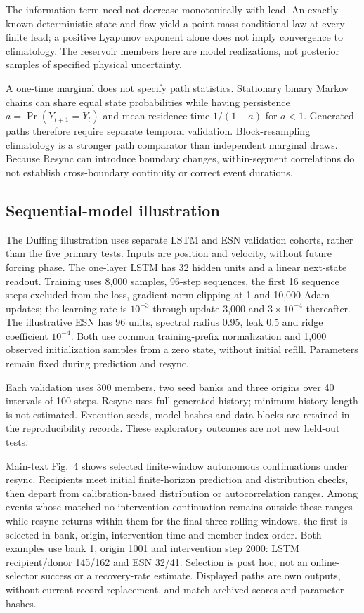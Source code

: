 \documentclass[gmd,manuscript]{copernicus}
\begin{document}
The information term need not decrease monotonically with lead. An exactly known deterministic state and flow yield a point-mass conditional law at every finite lead; a positive Lyapunov exponent alone does not imply convergence to climatology. The reservoir members here are model realizations, not posterior samples of specified physical uncertainty.

A one-time marginal does not specify path statistics. Stationary binary Markov chains can share equal state probabilities while having persistence $a=\Pr(Y_{t+1}=Y_t)$ and mean residence time $1/(1-a)$ for $a<1$. Generated paths therefore require separate temporal validation. Block-resampling climatology is a stronger path comparator than independent marginal draws. Because Resync can introduce boundary changes, within-segment correlations do not establish cross-boundary continuity or correct event durations.

\subsection{Sequential-model illustration}\label{app:note12}
The Duffing illustration uses separate LSTM and ESN validation cohorts, rather than the five primary tests. Inputs are position and velocity, without future forcing phase. The one-layer LSTM has 32 hidden units and a linear next-state readout. Training uses 8,000 samples, 96-step sequences, the first 16 sequence steps excluded from the loss, gradient-norm clipping at 1 and 10,000 Adam updates; the learning rate is $10^{-3}$ through update 3,000 and $3\times10^{-4}$ thereafter. The illustrative ESN has 96 units, spectral radius 0.95, leak 0.5 and ridge coefficient $10^{-4}$. Both use common training-prefix normalization and 1,000 observed initialization samples from a zero state, without initial refill. Parameters remain fixed during prediction and resync.

Each validation uses 300 members, two seed banks and three origins over 40 intervals of 100 steps. Resync uses full generated history; minimum history length is not estimated. Execution seeds, model hashes and data blocks are retained in the reproducibility records. These exploratory outcomes are not new held-out tests.

Main-text Fig.~4 shows selected finite-window autonomous continuations under resync. Recipients meet initial finite-horizon prediction and distribution checks, then depart from calibration-based distribution or autocorrelation ranges. Among events whose matched no-intervention continuation remains outside these ranges while resync returns within them for the final three rolling windows, the first is selected in bank, origin, intervention-time and member-index order. Both examples use bank 1, origin 1001 and intervention step 2000: LSTM recipient/donor 145/162 and ESN 32/41. Selection is post hoc, not an online-selector success or a recovery-rate estimate. Displayed paths are own outputs, without current-record replacement, and match archived scores and parameter hashes.
\end{document}
